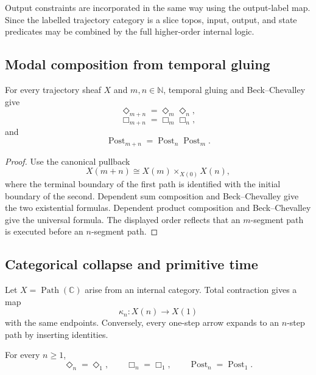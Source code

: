 Output constraints are incorporated in the same way using the output-label
map. Since the labelled trajectory category is a slice topos, input, output,
and state predicates may be combined by the full higher-order internal
logic.

\subsection{Modal composition from temporal gluing}
\label{subsec:modal-composition-gluing}

\begin{theorem}
\label{thm:composition-laws-temporal-modalities}
For every trajectory sheaf \(X\) and \(m,n\in\mathbb N\), temporal gluing
and Beck--Chevalley give
\[
    \Diamond_{m+n}
    =
    \Diamond_m\Diamond_n,
\]
\[
    \Box_{m+n}
    =
    \Box_m\Box_n,
\]
and
\[
    \operatorname{Post}_{m+n}
    =
    \operatorname{Post}_n\operatorname{Post}_m.
\]
\end{theorem}

\begin{proof}
Use the canonical pullback
\[
    X(m+n)
    \cong
    X(m)\times_{X(0)}X(n),
\]
where the terminal boundary of the first path is identified with the initial
boundary of the second. Dependent sum composition and Beck--Chevalley give
the two existential formulas. Dependent product composition and
Beck--Chevalley give the universal formula. The displayed order reflects that
an \(m\)-segment path is executed before an \(n\)-segment path.
\end{proof}

\subsection{Categorical collapse and primitive time}
\label{subsec:categorical-collapse-primitive-time}

Let \(X=\operatorname{Path}(\mathbb C)\) arise from an internal category.
Total contraction gives a map
\[
    \kappa_n:X(n)\to X(1)
\]
with the same endpoints. Conversely, every one-step arrow expands to an
\(n\)-step path by inserting identities.

\begin{proposition}
\label{prop:collapse-unconstrained-modalities}
For every \(n\geq1\),
\[
    \Diamond_n=\Diamond_1,
    \qquad
    \Box_n=\Box_1,
    \qquad
    \operatorname{Post}_n=\operatorname{Post}_1.
\]
\end{proposition}

